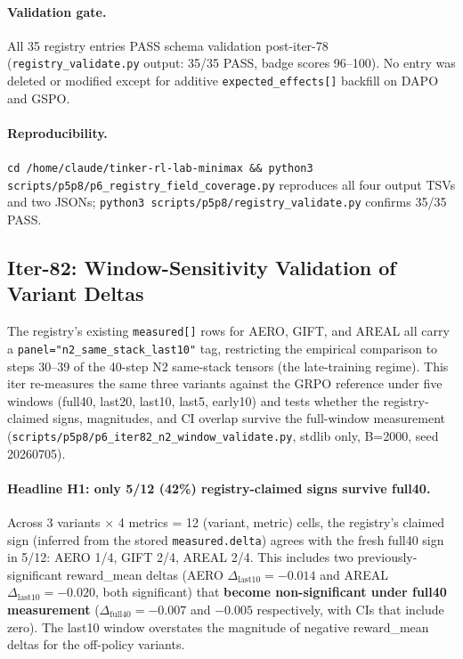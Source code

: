\documentclass{article}
\begin{document}
\paragraph{Validation gate.}
All 35 registry entries PASS schema validation post-iter-78
(\texttt{registry\_validate.py} output: 35/35 PASS, badge scores
96--100). No entry was deleted or modified except for additive
\texttt{expected\_effects[]} backfill on DAPO and GSPO.

\paragraph{Reproducibility.}
\texttt{cd /home/claude/tinker-rl-lab-minimax \&\& python3
scripts/p5p8/p6\_registry\_field\_coverage.py} reproduces all four
output TSVs and two JSONs; \texttt{python3 scripts/p5p8/registry\_validate.py}
confirms 35/35 PASS. \subsection{Iter-82: Window-Sensitivity Validation of Variant Deltas}
\label{sec:p6-iter82-window-sensitivity}

The registry's existing \texttt{measured[]} rows for AERO, GIFT, and AREAL
all carry a \texttt{panel="n2\_same\_stack\_last10"} tag, restricting
the empirical comparison to steps 30--39 of the 40-step N2 same-stack
tensors (the late-training regime). This iter re-measures the same
three variants against the GRPO reference under five windows
(full40, last20, last10, last5, early10) and tests whether the
registry-claimed signs, magnitudes, and CI overlap survive the
full-window measurement
(\texttt{scripts/p5p8/p6\_iter82\_n2\_window\_validate.py}, stdlib only,
B=2000, seed 20260705).

\paragraph{Headline H1: only 5/12 (42\%) registry-claimed signs survive full40.}
Across 3 variants $\times$ 4 metrics = 12 (variant, metric) cells,
the registry's claimed sign (inferred from the stored
\texttt{measured.delta}) agrees with the fresh full40 sign in 5/12:
AERO 1/4, GIFT 2/4, AREAL 2/4. This includes two previously-significant
reward\_mean deltas (AERO $\Delta_{\text{last10}}=-0.014$ and
AREAL $\Delta_{\text{last10}}=-0.020$, both significant) that
\textbf{become non-significant under full40 measurement}
($\Delta_{\text{full40}}=-0.007$ and $-0.005$ respectively, with CIs
that include zero). The last10 window overstates the magnitude of
negative reward\_mean deltas for the off-policy variants.
\end{document}
